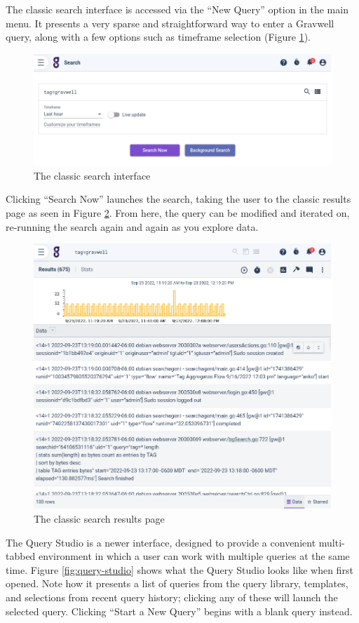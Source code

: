 The classic search interface is accessed via the ``New Query'' option in the main menu. It presents a very sparse and straightforward way to enter a Gravwell query, along with a few options such as timeframe selection (Figure \ref{fig:original-search}).

\begin{figure}
	\includegraphics[width=0.8\linewidth]{images/original-search.png}
	\caption{The classic search interface}
	\label{fig:original-search}
\end{figure}

Clicking ``Search Now'' launches the search, taking the user to the classic results page as seen in Figure \ref{fig:original-results}. From here, the query can be modified and iterated on, re-running the search again and again as you explore data.

\begin{figure}
	\includegraphics[width=0.9\linewidth]{images/original-results.png}
	\caption{The classic search results page}
	\label{fig:original-results}
\end{figure}

The Query Studio is a newer interface, designed to provide a convenient multi-tabbed environment in which a user can work with multiple queries at the same time. Figure \ref{fig:query-studio} shows what the Query Studio looks like when first opened. Note how it presents a list of queries from the query library, templates, and selections from recent query history; clicking any of these will launch the selected query. Clicking ``Start a New Query'' begins with a blank query instead.


